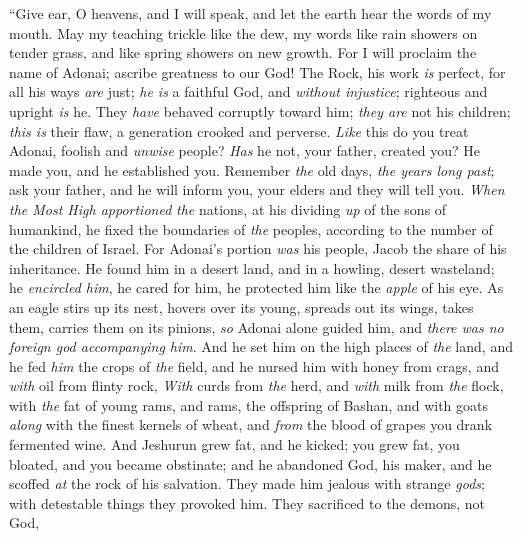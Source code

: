 \begin{biblechapter} %
 “Give ear, O heavens, and I will speak, 
and let the earth hear the words of my mouth.
\verse May my teaching trickle like the dew, 
my words like rain showers on tender grass, 
and like spring showers on new growth.
\verse For I will proclaim the name of Adonai; 
ascribe greatness to our God!
\verse The Rock, his work \textit{is} perfect, 
for all his ways \textit{are} just; 
\textit{he is} a faithful God, and \textit{without injustice}; 
righteous and upright \textit{is} he.
\verse They \textit{have} behaved corruptly toward him; 
\textit{they are} not his children; \textit{this is} their flaw, 
a generation crooked and perverse.
\verse \textit{Like} this do you treat Adonai, 
foolish and \textit{unwise} people? 
\textit{Has} he not, your father, created you? 
He made you, and he established you.
\verse Remember \textit{the} old days, \textit{the years long past}; 
ask your father, and he will inform you, 
your elders and they will tell you.
\verse \textit{When the Most High apportioned} \textit{the} nations, 
at his dividing \textit{up} of the sons of humankind, 
he fixed the boundaries of \textit{the} peoples, 
according to the number of the children of Israel.
\verse For Adonai’s portion \textit{was} his people, 
Jacob the share of his inheritance.
\verse He found him in a desert land, 
and in a howling, desert wasteland; 
he \textit{encircled him}, he cared for him, 
he protected him like the \textit{apple} of his eye.
\verse As an eagle stirs up its nest, 
hovers over its young, 
spreads out its wings, takes them, 
carries them on its pinions,
\verse \textit{so} Adonai alone guided him, 
and \textit{there was no foreign god accompanying him}.
\verse And he set him on the high places of \textit{the} land, 
and he fed \textit{him} the crops of \textit{the} field, 
and he nursed him with honey from crags, 
and \textit{with} oil from flinty rock,
\verse \textit{With} curds from \textit{the} herd, 
and \textit{with} milk from \textit{the} flock, 
with \textit{the} fat of young rams, 
and rams, the offspring of Bashan, 
and with goats \textit{along} with the finest kernels of wheat, 
and \textit{from} the blood of grapes you drank fermented wine.
\verse And Jeshurun grew fat, and he kicked; 
you grew fat, you bloated, and you became obstinate; 
and he abandoned God, his maker, 
and he scoffed \textit{at} the rock of his salvation.
\verse They made him jealous with strange \textit{gods}; 
with detestable things they provoked him.
\verse They sacrificed to the demons, not God, 

\end{biblechapter}
